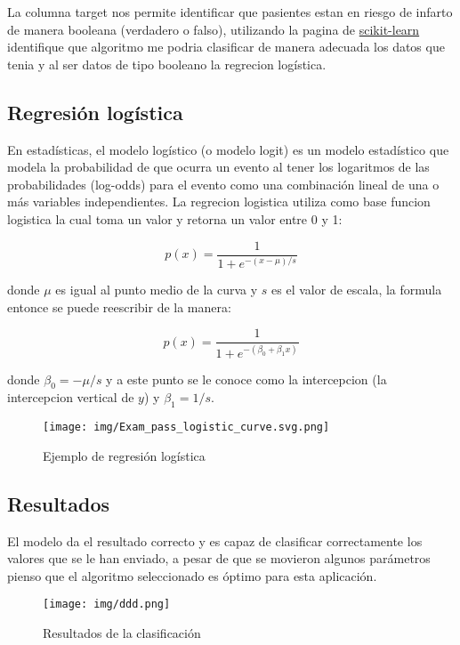 \documentclass[11pt]{article}
\begin{document}
La columna target nos permite identificar que pasientes estan en
riesgo de infarto de manera booleana (verdadero o falso), utilizando
la pagina de \href{https://scikit-learn.org/}{scikit-learn} identifique que algoritmo me podria
clasificar de manera adecuada los datos que tenia y al ser datos de
tipo booleano la regrecion logística.

\subsection{Regresión logística}
\label{sec:org4bbf083}
\autocite{wiki:Logistic_regression} En estadísticas, el modelo
logístico (o modelo logit) es un modelo estadístico que modela la
probabilidad de que ocurra un evento al tener los logaritmos de las
probabilidades (log-odds) para el evento como una combinación lineal
de una o más variables independientes. La regrecion logistica utiliza
como base funcion logistica \autocite{wiki:Logistic_function} la
cual toma un valor y retorna un valor entre 0 y 1:

\[
p(x) = \frac{1}{1 + e^{-( x - \mu )/s}}
\]

donde \(\mu\) es igual al punto medio de la curva y \(s\) es el valor
de escala, la formula entonce se puede reescribir de la manera:

\[
p(x) = \frac{1}{1 + e^{-( \beta_0 + \beta_1 x )}}
\]

donde \(\beta_0 = -\mu / s\) y a este punto se le conoce como la
intercepcion (la intercepcion vertical de \(y\)) y \(\beta_1 = 1/s\).

\begin{figure}[htbp]
\centering
\texttt{[image: img/Exam\_pass\_logistic\_curve.svg.png]}
\caption{Ejemplo de regresión logística}
\end{figure}

\subsection{Resultados}
\label{sec:org01d0243}
El modelo da el resultado correcto y es capaz de clasificar
correctamente los valores que se le han enviado, a pesar de que se
movieron algunos parámetros pienso que el algoritmo seleccionado es
óptimo para esta aplicación. 

\begin{figure}[htbp]
\centering
\texttt{[image: img/ddd.png]}
\caption{Resultados de la clasificación}
\end{figure}
\end{document}
